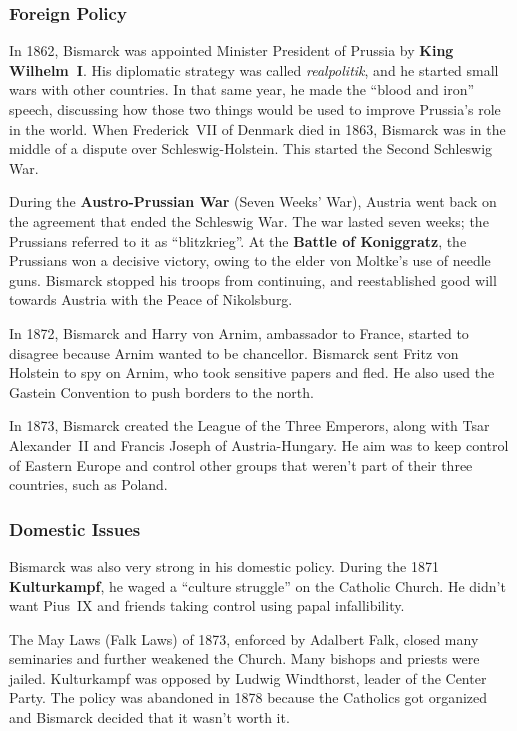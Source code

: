 \subsubsection*{Foreign Policy}

In 1862, Bismarck was appointed Minister President of Prussia by \textbf{King Wilhelm~I}.
His diplomatic strategy was called \textit{realpolitik}, and he started small wars with other countries.
In that same year, he made the ``blood and iron'' speech,
discussing how those two things would be used to improve Prussia's role in the world.
When Frederick~VII of Denmark died in 1863, Bismarck was in the middle of a dispute over Schleswig-Holstein.
This started the Second Schleswig War.

During the \textbf{Austro-Prussian War} (Seven Weeks' War),
Austria went back on the agreement that ended the Schleswig War.
The war lasted seven weeks; the Prussians referred to it as ``blitzkrieg''.
At the \textbf{Battle of Koniggratz}, the Prussians won a decisive victory,
owing to the elder von Moltke's use of needle guns.
Bismarck stopped his troops from continuing,
and reestablished good will towards Austria with the Peace of Nikolsburg.

In 1872, Bismarck and Harry von Arnim, ambassador to France, started to disagree because Arnim wanted to be chancellor.
Bismarck sent Fritz von Holstein to spy on Arnim, who took sensitive papers and fled.
He also used the Gastein Convention to push borders to the north.

In 1873, Bismarck created the League of the Three Emperors,
along with Tsar Alexander~II and Francis Joseph of Austria-Hungary.
He aim was to keep control of Eastern Europe and control other groups that weren't part of their three countries,
such as Poland.

\subsubsection*{Domestic Issues}

Bismarck was also very strong in his domestic policy.
During the 1871 \textbf{Kulturkampf}, he waged a ``culture struggle'' on the Catholic Church.
He didn't want Pius~IX and friends taking control using papal infallibility.

The May Laws (Falk Laws) of 1873, enforced by Adalbert Falk, closed many seminaries and further weakened the Church.
Many bishops and priests were jailed.
Kulturkampf was opposed by Ludwig Windthorst, leader of the Center Party.
The policy was abandoned in 1878 because the Catholics got organized and Bismarck decided that it wasn't worth it.

